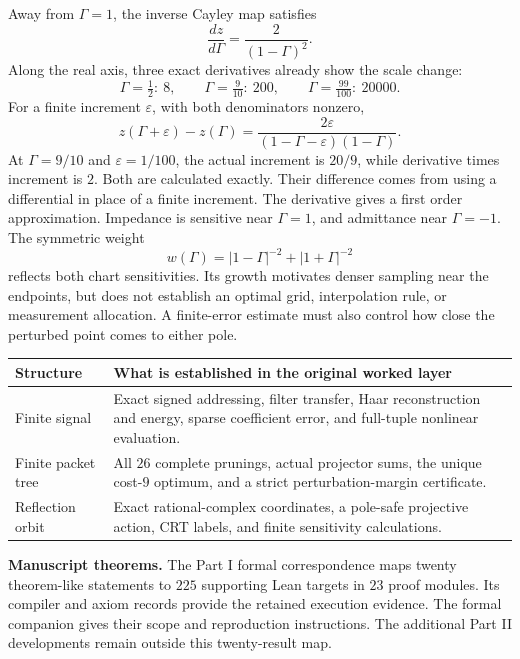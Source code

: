 Away from $\Gamma=1$, the inverse Cayley map satisfies
\[
\frac{dz}{d\Gamma}=\frac2{(1-\Gamma)^2}.
\]
Along the real axis, three exact derivatives already show the scale change:
\[
\Gamma=\tfrac12:\ 8,\qquad
\Gamma=\tfrac9{10}:\ 200,\qquad
\Gamma=\tfrac{99}{100}:\ 20000.
\]
For a finite increment $\varepsilon$, with both denominators nonzero,
\[
z(\Gamma+\varepsilon)-z(\Gamma)
=\frac{2\varepsilon}{(1-\Gamma-\varepsilon)(1-\Gamma)}.
\]
At $\Gamma=9/10$ and $\varepsilon=1/100$, the actual increment is $20/9$, while derivative times increment is $2$. Both are calculated exactly. Their difference comes from using a differential in place of a finite increment. The derivative gives a first order approximation.
Impedance is sensitive near $\Gamma=1$, and admittance near $\Gamma=-1$. The symmetric weight
\[
w(\Gamma)=|1-\Gamma|^{-2}+|1+\Gamma|^{-2}
\]
reflects both chart sensitivities. Its growth motivates denser sampling near the endpoints, but does not establish an optimal grid, interpolation rule, or measurement allocation. A finite-error estimate must also control how close the perturbed point comes to either pole.

\begin{tabularx}{\linewidth}{@{}p{.24\linewidth}X@{}}
\toprule
Structure & What is established in the original worked layer\\\midrule
Finite signal & Exact signed addressing, filter transfer, Haar reconstruction and energy, sparse coefficient error, and full-tuple nonlinear evaluation.\\
Finite packet tree & All $26$ complete prunings, actual projector sums, the unique cost-$9$ optimum, and a strict perturbation-margin certificate.\\
Reflection orbit & Exact rational-complex coordinates, a pole-safe projective action, CRT labels, and finite sensitivity calculations.\\\bottomrule
\end{tabularx}
\textbf{Manuscript theorems.} The Part I formal correspondence maps twenty theorem-like statements to $225$ supporting Lean targets in $23$ proof modules. Its compiler and axiom records provide the retained execution evidence. The formal companion gives their scope and reproduction instructions. The additional Part II developments remain outside this twenty-result map.

